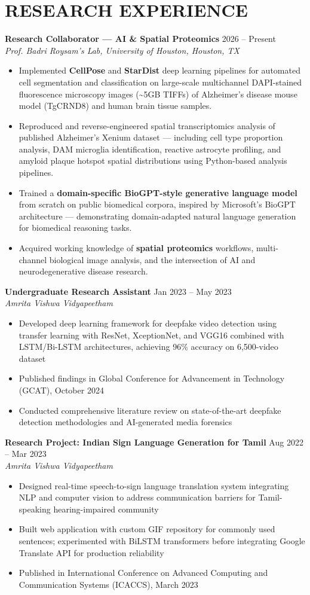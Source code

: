\documentclass[11pt,a4paper]{article}
\newcommand{\CVItem}[1]{\item{#1}}
\newcommand{\CVSubheading}[4]{
  \vspace{2pt}
  \textbf{#1} \hfill #2 \\
  \textit{#3} \hfill \textit{#4}
  \vspace{3pt}
}
\begin{document}
\section{RESEARCH EXPERIENCE}
\textbf{Research Collaborator --- AI \& Spatial Proteomics} \hfill 2026 -- Present \\
\textit{Prof. Badri Roysam's Lab, University of Houston, Houston, TX}
\begin{itemize}
  \item Implemented \textbf{CellPose} and \textbf{StarDist} deep learning pipelines for automated cell segmentation and classification on large-scale multichannel DAPI-stained fluorescence microscopy images (\textasciitilde5GB TIFFs) of Alzheimer's disease mouse model (TgCRND8) and human brain tissue samples.
  \item Reproduced and reverse-engineered spatial transcriptomics analysis of published Alzheimer's Xenium dataset — including cell type proportion analysis, DAM microglia identification, reactive astrocyte profiling, and amyloid plaque hotspot spatial distributions using Python-based analysis pipelines.
  \item Trained a \textbf{domain-specific BioGPT-style generative language model} from scratch on public biomedical corpora, inspired by Microsoft's BioGPT architecture — demonstrating domain-adapted natural language generation for biomedical reasoning tasks.
  \item Acquired working knowledge of \textbf{spatial proteomics} workflows, multi-channel biological image analysis, and the intersection of AI and neurodegenerative disease research.
\end{itemize}
\CVSubheading
{Undergraduate Research Assistant}
{Jan 2023 -- May 2023}
{Amrita Vishwa Vidyapeetham}
{}
\begin{itemize}
    \CVItem{Developed deep learning framework for deepfake video detection using transfer learning with ResNet, XceptionNet, and VGG16 combined with LSTM/Bi-LSTM architectures, achieving 96\% accuracy on 6,500-video dataset}
    \CVItem{Published findings in Global Conference for Advancement in Technology (GCAT), October 2024}
    \CVItem{Conducted comprehensive literature review on state-of-the-art deepfake detection methodologies and AI-generated media forensics}
\end{itemize}

\CVSubheading
{Research Project: Indian Sign Language Generation for Tamil}
{Aug 2022 -- Mar 2023}
{Amrita Vishwa Vidyapeetham}
{}
\begin{itemize}
    \CVItem{Designed real-time speech-to-sign language translation system integrating NLP and computer vision to address communication barriers for Tamil-speaking hearing-impaired community}
    \CVItem{Built web application with custom GIF repository for commonly used sentences; experimented with BiLSTM transformers before integrating Google Translate API for production reliability}
    \CVItem{Published in International Conference on Advanced Computing and Communication Systems (ICACCS), March 2023}
\end{itemize}
\end{document}
